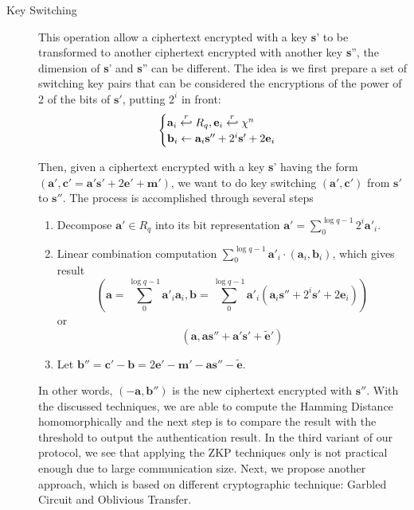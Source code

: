 \begin{description}
\item[Key Switching] This operation allow a ciphertext encrypted with a key
  \textbf{s}' to be transformed to another ciphertext encrypted with another key
  \textbf{s}'', the dimension of \textbf{s}' and \textbf{s}'' can be
  different. The idea is we first prepare a set of switching key pairs that can
  be considered the encryptions of the power of 2 of the bits of $\mathbf{s}'$,
  putting $2^{i}$ in front:
  \[
    \begin{cases}
      \mathbf{a}_{i} \stackrel{r}{\hookleftarrow} R_{q}, \mathbf{e}_{i} \stackrel{r}{\hookleftarrow} \chi^{n}\\
      \mathbf{b}_{i} \gets \mathbf{a}_{i}\mathbf{s}'' + 2^{i}\mathbf{s}' + 2\mathbf{e}_{i}
    \end{cases}
  \]

  Then, given a ciphertext encrypted with a key \textbf{s}' having the form
  $(\mathbf{a}', \mathbf{c}' = \mathbf{a}'\mathbf{s}' + 2\mathbf{e}' +
  \mathbf{m}')$, we want to do key switching $(\mathbf{a}',\mathbf{c}')$ from
  $\mathbf{s}'$ to $\mathbf{s}''$. The process is accomplished through several steps
  \begin{enumerate}
  \item Decompose $\mathbf{a}' \in R_{q}$ into its bit representation
    $\mathbf{a}' = \sum_{0}^{\log q - 1}2^{i}\mathbf{a}'_{i}$.
  \item Linear combination computation
    $\sum_{0}^{\log q - 1}\mathbf{a}'_{i} \cdot (\mathbf{a}_{i},
    \mathbf{b}_{i})$, which gives result
    $$(\mathbf{a} = \sum_{0}^{\log q - 1}\mathbf{a}'_{i}\mathbf{a}_{i},
    \mathbf{b} = \sum_{0}^{\log q - 1}\mathbf{a}'_{i}(\mathbf{a}_{i}\mathbf{s}''
    + 2^{i}\mathbf{s}' + 2\mathbf{e}_{i}))$$
    or
    $$(\mathbf{a}, \mathbf{a}\mathbf{s}'' + \mathbf{a}'\mathbf{s}' + \tilde{\mathbf{e}}')$$
  \item Let $\mathbf{b}'' = \mathbf{c}' - \mathbf{b} = 2\mathbf{e}' - \mathbf{m}' -\mathbf{a}\mathbf{s}'' - \tilde{\mathbf{e}}$.
  \end{enumerate}

  In other words, $(-\mathbf{a}, \mathbf{b}'')$ is the new ciphertext encrypted
  with $\mathbf{s}''$. With the discussed techniques, we are able to compute the
  Hamming Distance homomorphically and the next step is to compare the result
  with the threshold to output the authentication result. In the third variant
  of our protocol, we see that applying the ZKP techniques only is not practical
  enough due to large communication size. Next, we propose another approach,
  which is based on different cryptographic technique: Garbled Circuit and
  Oblivious Transfer.
\end{description}

